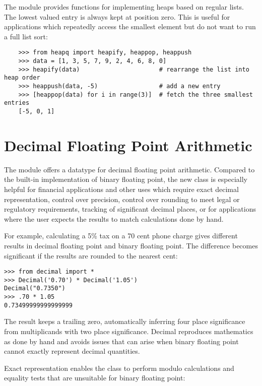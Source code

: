 \documentclass{manual}
\begin{document}
The  module provides
functions for implementing heaps based on regular lists.  The lowest
valued entry is always kept at position zero.  This is useful for
applications which repeatedly access the smallest element but do not
want to run a full list sort:

\begin{verbatim}
    >>> from heapq import heapify, heappop, heappush
    >>> data = [1, 3, 5, 7, 9, 2, 4, 6, 8, 0]
    >>> heapify(data)                      # rearrange the list into heap order
    >>> heappush(data, -5)                 # add a new entry
    >>> [heappop(data) for i in range(3)]  # fetch the three smallest entries
    [-5, 0, 1]
\end{verbatim}


\section{Decimal Floating Point Arithmetic\label{decimal-fp}}

The  module offers a
 datatype for decimal floating point arithmetic.  Compared to
the built-in  implementation of binary floating point, the new
class is especially helpful for financial applications and other uses which
require exact decimal representation, control over precision, control over
rounding to meet legal or regulatory requirements, tracking of significant
decimal places, or for applications where the user expects the results to
match calculations done by hand.

For example, calculating a 5\%{} tax on a 70 cent phone charge gives
different results in decimal floating point and binary floating point.
The difference becomes significant if the results are rounded to the
nearest cent:

\begin{verbatim}
>>> from decimal import *       
>>> Decimal('0.70') * Decimal('1.05')
Decimal("0.7350")
>>> .70 * 1.05
0.73499999999999999       
\end{verbatim}

The  result keeps a trailing zero, automatically inferring four
place significance from multiplicands with two place significance.  Decimal reproduces
mathematics as done by hand and avoids issues that can arise when binary
floating point cannot exactly represent decimal quantities.

Exact representation enables the  class to perform
modulo calculations and equality tests that are unsuitable for binary
floating point:
\end{document}
